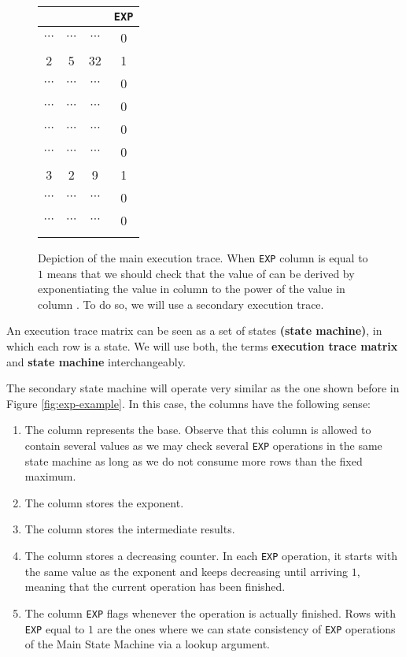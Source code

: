 \begin{figure}[ht]
\centering
\begin{tabular}{|c|c|c|c|}
\hline
\A &  \B & \C &  \texttt{EXP}\\ \hline
$\cdots$ & $\cdots$ & $\cdots$ & 0 \\ \hline
2 & 5 & 32 & 1 \\ \hline
$\cdots$ & $\cdots$ & $\cdots$ & 0 \\ \hline
$\cdots$ & $\cdots$ & $\cdots$ & 0 \\ \hline
$\cdots$ & $\cdots$ & $\cdots$ & 0 \\ \hline
$\cdots$ & $\cdots$ & $\cdots$ & 0 \\ \hline
3 & 2 & 9 & 1 \\ \hline
$\cdots$ & $\cdots$ & $\cdots$ & 0 \\ \hline
$\cdots$ & $\cdots$ & $\cdots$ & 0 \\ \hline
& & & \\ \hline
\end{tabular}
\caption{Depiction of the main execution trace. When \texttt{EXP} column is equal to $1$ means that we should check that the value of \C can be derived by exponentiating the value in column \A to the power of the value in column \B. To do so, we will use a secondary execution trace. }
\label{fig:main-sm-exp-example}
\end{figure}

\begin{bremark}
An execution trace matrix can be seen as a set of states \textbf{(state machine)}, in which each row is a state. We will use both, the
terms \textbf{execution trace matrix} and \textbf{state machine} interchangeably.
\end{bremark}

The secondary state machine will operate very similar as the one shown before in Figure \ref{fig:exp-example}. In this case, the columns have the following sense:
\begin{enumerate}
\small
\item The \A column represents the base. Observe that this column is allowed to contain several values as we may check several \texttt{EXP} operations in the same state machine as long as we do not consume more rows than the fixed maximum.

\item The \B column stores the exponent.

\item The \C column stores the intermediate results.

\item The column \D stores a decreasing counter. In each \texttt{EXP} operation, it starts with the same value as the exponent and keeps decreasing until arriving $1$, meaning that the current operation has been finished.

\item The column \texttt{EXP} flags whenever the operation is actually finished. Rows with \texttt{EXP} equal to $1$ are the ones where we can state consistency of \texttt{EXP} operations of the Main State Machine via a lookup argument.
\end{enumerate}

